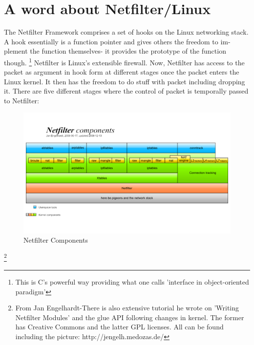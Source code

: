 \documentclass[11pt,left=2cm,bottom=2cm,oneside]{book}
\begin{document}
\section{A word about Netfilter/Linux}
The Netfilter Framework comprises a set of hooks on the Linux networking
stack. A hook essentially is a function pointer and gives others the freedom to im-
plement the function themselves- it provides the prototype of the function though.
\footnote{This is C's powerful way providing what one calls 'interface in object-oriented paradigm'}
Netfilter is Linux's extensible firewall. Now, Netfilter has access to the packet as
argument in hook form at different stages once the packet enters the Linux kernel.
It then has the freedom to do stuff with packet including dropping it. There are
five different stages where the control of packet is temporally passed to Netfilter:
\begin{figure}[H]
\includegraphics[width=1.3\textwidth]{xtables.png}
\caption{Netfilter Components}
\end{figure}
\footnote{From Jan Engelhardt-There is also extensive tutorial he wrote on 'Writing Netfilter Modules'
and the glue API following changes in kernel. The former has Creative Commons and the latter
GPL licenses. All can be found including the picture: http://jengelh.medozas.de/
}
\end{document}
